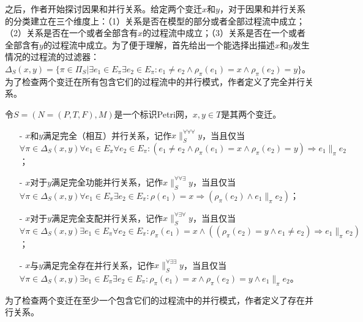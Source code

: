 之后，作者开始探讨因果和并行关系。给定两个变迁$x$和$y$，对于因果和并行关系的分类建立在三个维度上：（1）关系是否在模型的部分或者全部过程流中成立；（2）关系是否在一个或者全部含有$x$的过程流中成立；（3）关系是否在一个或者全部含有$y$的过程流中成立。为了便于理解，首先给出一个能选择出描述$x$和$y$发生情况的过程流的过滤器：$\Delta_{S}(x,y)=\{\pi\in\Pi_{S}|\exists e_{1}\in E_{\pi}\exists e_{2}\in E_{\pi}:e_{1}\neq e_{2}\wedge\rho_{\pi}(e_{1})=x\wedge\rho_{\pi}(e_{2})=y\}$。为了检查两个变迁在所有包含它们的过程流中的并行模式，作者定义了完全并行关系。
\begin{definition}[完全并行]\label{def:total_concurrency}
令$S=(N=(P,T,F),M)$是一个标识Petri网，$x,y\in T$是其两个变迁。
  \begin{itemize}[leftmargin=22pt]
    \item[-] $x$和$y$满足完全（相互）并行关系，记作$x\parallel_{S}^{\forall\forall\forall}y$，当且仅当\\
    $
      \forall\pi\in\Delta_{S}(x,y)\forall e_{1}\in E_{\pi}\forall e_{2}\in E_{\pi}:(e_{1}\neq e_{2}\wedge\rho_{\pi}(e_{1})=x\wedge\rho_{\pi}(e_{2})=y)\Rightarrow e_{1}\parallel_{\pi}e_{2}
    $；
    \item[-] $x$对于$y$满足完全功能并行关系，记作$x\parallel_{S}^{\forall\forall\exists}y$，当且仅当\\
    $
      \forall\pi\in\Delta_{S}(x,y)\forall e_{1}\in E_{\pi}\exists e_{2}\in E_{\pi}:\rho(e_{1})=x\Rightarrow(\rho_{\pi}(e_{2})\wedge e_{1}\parallel_{\pi}e_{2})
    $；
    \item[-] $x$对于$y$满足完全支配并行关系，记作$x\parallel_{S}^{\forall\exists\forall}y$，当且仅当\\
    $
      \forall\pi\in\Delta_{S}(x,y)\exists e_{1}\in E_{\pi}\forall e_{2}\in E_{\pi}:\rho_{\pi}(e_{1})=x\wedge((\rho_{\pi}(e_{2})=y\wedge e_{1}\neq e_{2})\Rightarrow e_{1}\parallel_{\pi}e_{2})
    $；
    \item[-] $x$与$y$满足完全存在并行关系，记作$x\parallel_{S}^{\forall\exists\exists}y$，当且仅当\\
    $
      \forall\pi\in\Delta_{S}(x,y)\exists e_{1}\in E_{\pi}\exists e_{2}\in E_{\pi}:\rho_{\pi}(e_{1})=x\wedge\rho_{\pi}(e_{2})=y\wedge e_{1}\parallel_{\pi}e_{2}
    $。
  \end{itemize}
\end{definition}
为了检查两个变迁在至少一个包含它们的过程流中的并行模式，作者定义了存在并行关系。
